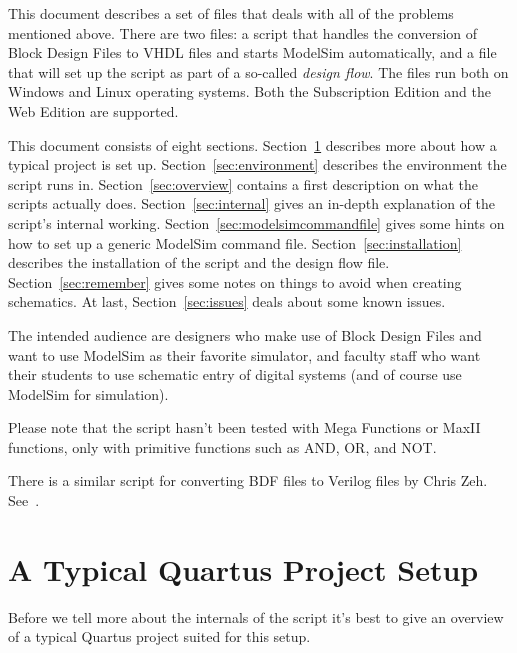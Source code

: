 \documentclass[11pt,a4paper,final,oneside,titlepage,fleqn]{article}
\begin{document}
This document describes a set of files that deals with all of the problems
mentioned above. There are two files: a script that handles the conversion of
Block Design Files to VHDL files and starts ModelSim automatically, and a file
that will set up the script as part of a so-called \textit{design flow}. The
files run both on Windows and Linux operating systems. Both the Subscription
Edition and the Web Edition are supported.

This document consists of eight sections. %
Section~\ref{sec:projsetup} describes more about how a typical project is set
up.
Section~\ref{sec:environment} describes the environment the script runs in.
Section~\ref{sec:overview} contains a first description on what the scripts
actually does.
Section~\ref{sec:internal} gives an in-depth explanation of the script's
internal working.
Section~\ref{sec:modelsimcommandfile} gives some hints on how to set up a
generic ModelSim command file.
Section~\ref{sec:installation} describes the installation of the script and
the design flow file.
Section~\ref{sec:remember} gives some notes on things to avoid when
creating schematics.
At last, Section~\ref{sec:issues} deals about some known issues.

The intended audience are designers who make use of Block Design Files and
want to use ModelSim as their favorite simulator, and faculty staff who
want their students to use schematic entry of digital systems (and of course
use ModelSim for simulation).

Please note that the script hasn't been tested with Mega Functions or MaxII
functions, only with primitive functions such as AND, OR, and NOT.

There is a similar script for converting BDF files to Verilog files by Chris
Zeh. See~\cite{web/fixer}.


\section{A Typical Quartus Project Setup}
\label{sec:projsetup}
Before we tell more about the internals of the script it's best to give an
overview of a typical Quartus project suited for this setup.
\end{document}
